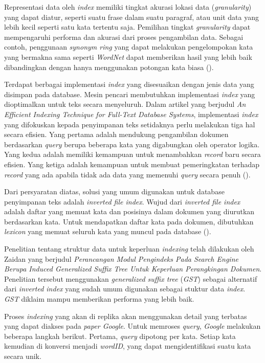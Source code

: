 Representasi data oleh \emph{index} memiliki tingkat akurasi lokasi data
(\emph{granularity}) yang dapat diatur, seperti suatu frase dalam suatu
paragraf, atau unit data yang lebih kecil seperti satu kata tertentu saja.
Pemilihan tingkat \emph{granularity} dapat mempengaruhi performa dan akurasi
dari proses pengambilan data. Sebagai contoh, penggunaan \emph{synonym ring}
yang dapat melakukan pengelompokan kata yang bermakna sama seperti
\emph{WordNet} dapat memberikan hasil yang lebih baik dibandingkan dengan hanya
menggunakan potongan kata biasa (\cite{gonzalo1998wordnet}).

Terdapat berbagai implementasi \emph{index} yang disesuaikan dengan jenis data
yang disimpan pada database. Mesin pencari membutuhkan implementasi \emph{index}
yang dioptimalkan untuk teks secara menyeluruh. Dalam artikel yang berjudul
\emph{An Efficient Indexing Technique for Full-Text Database Systems}, 
implementasi \emph{index} yang difokuskan kepada penyimpanan teks setidaknya
perlu melakukan tiga hal secara efisien. Yang pertama adalah mendukung
pengambilan dokumen berdasarkan \emph{query} berupa beberapa kata yang
digabungkan oleh operator logika. Yang kedua adalah memiliki kemampuan untuk
menambahkan \emph{record} baru secara efisien. Yang ketiga adalah kemampuan
untuk membuat pemeringkatan terhadap \emph{record} yang ada apabila tidak ada
data yang memenuhi \emph{query} secara penuh (\cite{zobel1992efficient}).

Dari persyaratan diatas, solusi yang umum digunakan untuk database penyimpanan
teks adalah \emph{inverted file index}. Wujud dari \emph{inverted file index}
adalah daftar yang memuat kata dan posisinya dalam dokumen yang diurutkan
berdasarkan kata.  Untuk mendapatkan daftar kata pada dokumen, dibutuhkan
\emph{lexicon} yang memuat seluruh kata yang muncul pada database
(\cite{hersh2001gigabytes}).

Penelitian tentang struktur data untuk keperluan \emph{indexing} telah dilakukan
oleh Zaidan yang berjudul \emph{Perancangan Modul Pengindeks Pada Search Engine
Berupa Induced Generalized Suffix Tree Untuk Keperluan Perangkingan Dokumen}.
Penelitian tersebut menggunakan \emph{generalized suffix tree} (\emph{GST})
sebagai alternatif dari \emph{inverted index} yang sudah umum digunakan sebagai
stuktur data \emph{index}. \emph{GST} diklaim mampu memberikan performa yang
lebih baik.

Proses \emph{indexing} yang akan di replika akan menggunakan detail yang
terbatas yang dapat diakses pada \emph{paper Google}.  Untuk memroses
\emph{query}, \emph{Google} melakukan beberapa langkah berikut.  Pertama,
\emph{query} dipotong per kata. Setiap kata kemudian di konversi menjadi
\emph{wordID}, yang dapat mengidentifikasi suatu kata secara unik.

